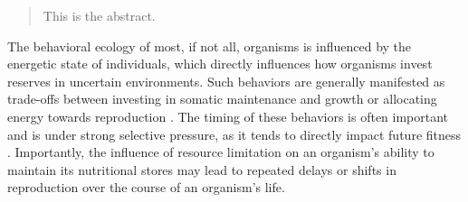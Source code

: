 \documentclass{pnastwo}
\begin{document}
\begin{article}


\begin{abstract}
This is the abstract.
\end{abstract}

The behavioral ecology of most, if not all, organisms is influenced by the energetic state of individuals, which directly influences how organisms invest reserves in uncertain environments.
Such behaviors are generally manifested as trade-offs between investing in somatic maintenance and growth or allocating energy towards reproduction \cite{Martin:1987dl,Kirk:1997cc,Kempes:2012hy}. %
The timing of these behaviors is often important and is under strong selective pressure, as it tends to directly impact future fitness \cite{Mangel:1988uaa}.
Importantly, the influence of resource limitation on an organism's ability to maintain its nutritional stores may lead to repeated delays or shifts in reproduction over the course of an organism's life. %


\end{article}
\end{document}

